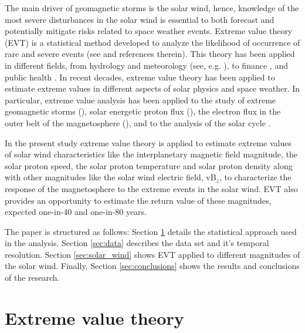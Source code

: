 \documentclass{article}
\begin{document}
The main driver of geomagnetic storms is the solar wind, hence, knowledge of the most severe disturbances in the solar wind is essential to both forecast and potentially mitigate risks related to space weather events. 
Extreme value theory (EVT) is a statistical method developed to analyze the likelihood of occurrence of rare and severe events (see \cite{Gumbel_1958_extreme, Coles_2001_Extreme_Book} and references therein). This theory has been applied in different fields, from hydrology and meteorology (see, e.g. \cite{Gumbel_1958_extreme}), to finance \cite{Embrechts_1994_Extreme_Events_Finance}, and public health \cite{Thomas_2016_extreme_public_health}. 
In recent decades, extreme value theory has been applied to estimate extreme values in different aspects of solar physics and space weather. In particular, extreme value analysis has been applied to the study of extreme geomagnetic storms (\cite{Siscoe_1976_extreme_events, Chen_2019_Extreme_Events,Elvidge_2020_Extreme_value,Love_2015_extreme_dst,Love_2019_Extreme_values, Nikitina_2016_Extremes,Thomson_2011_Extreme_values}), solar energetic proton flux (\cite{Koons_2001_extreme_values,Ruzmiakin_2011_extreme_values}), the electron flux in the outer belt of the magnetosphere (\cite{OBrien_2007_extreme_events}), and to the analysis of the solar cycle \cite{Asensio_2018_Extreme_value, Acero_2018_Extreme_sunspots}.  

In the present study extreme value theory is applied to estimate extreme values of solar wind characteristics like the interplanetary magnetic field magnitude, the solar proton speed, the solar proton temperature and solar proton density along with other magnitudes like the solar wind electric field, vB$_{z}$, to characterize the response of the magnetosphere to the extreme events in the solar wind. EVT also provides an opportunity to estimate the return value of these magnitudes, expected one-in-40 and one-in-80 years.

The paper is structured as follows: Section \ref{sec:extreme_values} details the statistical approach used in the analysis.
Section \ref{sec:data} describes the data set and it's temporal resolution.
Section \ref{sec:solar_wind} shows EVT applied to different magnitudes of the solar wind. Finally, Section \ref{sec:conclusions} shows the results and conclusions of the research.
 
\section{Extreme value theory} \label{sec:extreme_values}
\end{document}
